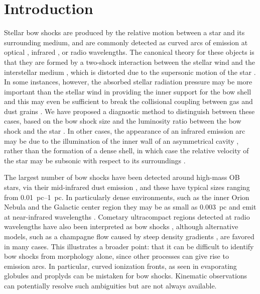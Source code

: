 
\section{Introduction}
\label{sec:introduction}

Stellar bow shocks are produced by the relative motion between a star
and its surrounding medium, and are commonly detected as curved arcs
of emission at optical \citep{Gull:1979a, Brown:2005a}, infrared
\citep{van-Buren:1988a, Kobulnicky:2016a}, or radio
\citep{van-Buren:1990a, Benaglia:2010a} wavelengths.  The canonical
theory for these objects is that they are formed by a two-shock
interaction between the stellar wind and the interstellar medium
\citep{Pikelner:1968a, Dyson:1972a}, which is distorted due to the
supersonic motion of the star \citep{Baranov:1970a, Wilkin:1996a}.  In
some instances, however, the absorbed stellar radiation pressure may
be more important than the stellar wind in providing the inner support
for the bow shell \citep[Paper~I]{Henney:2019a} and this may even be
sufficient to break the collisional coupling between gas and dust
grains \citep[Paper~II]{Henney:2019b}.  We have proposed a diagnostic
method to distinguish between these cases, based on the bow shock size
and the luminosity ratio between the bow shock and the star
\citep[Paper~III]{Henney:2019c}. In other cases, the appearance of an
infrared emission arc may be due to the illumination of the inner wall
of an asymmetrical cavity \citep{Mackey:2016a}, rather than the
formation of a dense shell, in which case the relative velocity of the
star may be subsonic with respect to its surroundings
\citep{Mackey:2015a}.

The largest number of bow shocks have been detected around high-mass
OB stars, via their mid-infrared dust emission \citep{van-Buren:1995a,
  Noriega-Crespo:1997b, Povich:2008a, Kobulnicky:2010a, Peri:2012a,
  Peri:2015a, Sexton:2015b, Kobulnicky:2016a, Bodensteiner:2018a}, and
these have typical sizes ranging from \SIrange{0.01}{1}{pc}. In
particularly dense environments, such as the inner Orion Nebula
\citep{Smith:2005a} and the Galactic center region
\citep{Geballe:2004a} they may be as small as \SI{0.003}{pc} and emit
at near-infrared wavelengths \citep{Tanner:2005a,
  Sanchez-Bermudez:2014a}.  Cometary ultracompact \hii{} regions
detected at radio wavelengths \citep{Reid:1985a, Wood:1989a,
  Klaassen:2018a} have also been interpreted as bow shocks
\citep{van-Buren:1990a, Mac-Low:1991a}, although alternative models,
such as a champagne flow caused by steep density gradients
\citep{Cyganowski:2003a, Arthur:2006a, Immer:2014a, Steggles:2017a},
are favored in many cases.  This illustrates a broader point: that it
can be difficult to identify bow shocks from morphology alone, since
other processes can give rise to emission arcs.  In particular, curved
ionization fronts, as seen in evaporating globules \citep{Sahai:2012b}
and proplyds \citep{ODell:1993a} can be mistaken for bow shocks.
Kinematic observations can potentially resolve such ambiguities but
are not always available.

